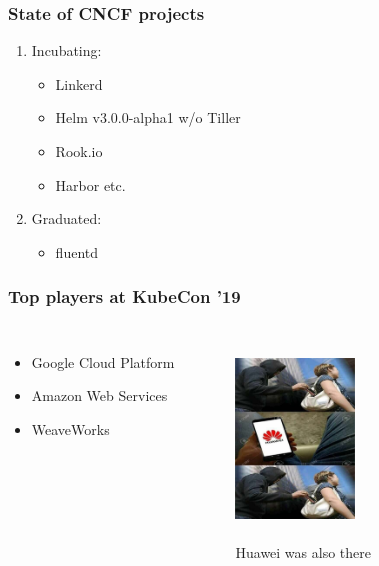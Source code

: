 \documentclass[default]{beamer}
\begin{document}
\begin{frame}
  \frametitle{State of CNCF projects}\footnotemark
  \begin{enumerate}
    \item Incubating:
    \begin{itemize}
      \item Linkerd
      \item Helm v3.0.0-alpha1 w/o Tiller
      \item Rook.io
      \item Harbor etc.
    \end{itemize}
    \item Graduated:
    \begin{itemize}
      \item fluentd
    \end{itemize}
  \end{enumerate}
\end{frame}

\begin{frame}
  \frametitle{Top players at KubeCon '19}   %
  \begin{columns}[c]
    \column{2in}
      \begin{itemize}
        \item Google Cloud Platform
        \item Amazon Web Services
        \item WeaveWorks
      \end{itemize}
    \column{2in}
    \begin{figure}
      \includegraphics[width=90pt,height=150pt]{static/img01.jpeg}
      \caption{Huawei was also there}
    \end{figure}
  \end{columns}
\end{frame}
\end{document}
